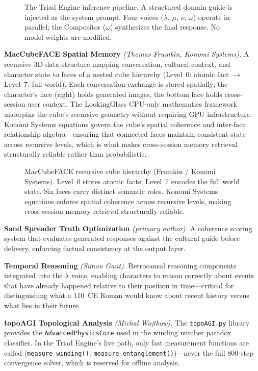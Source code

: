 \documentclass[11pt,a4paper]{article}
\begin{document}
\begin{figure}[h]
\centering

\caption{The Triad Engine inference pipeline. A structured domain guide is
injected as the system prompt. Four voices ($\lambda$, $\mu$, $\nu$,
$\omega$) operate in parallel; the Compositor ($\omega$) synthesizes the
final response. No model weights are modified.}
\label{fig:triad_integration}
\end{figure}

\medskip
\textbf{MacCubeFACE Spatial Memory} \textit{(Thomas Frumkin, Konomi
Systems).} A recursive 3D data structure mapping conversation, cultural
context, and character state to faces of a nested cube hierarchy (Level~0:
atomic fact $\to$ Level~7: full world). Each conversation exchange is stored
spatially; the character's face (right) holds generated images, the bottom
face holds cross-session user context. The LookingGlass CPU-only mathematics
framework underpins the cube's recursive geometry without requiring GPU
infrastructure. Konomi Systems equations govern the cube's spatial coherence
and inter-face relationship algebra---ensuring that connected faces maintain
consistent state across recursive levels, which is what makes cross-session
memory retrieval structurally reliable rather than probabilistic.

\begin{figure}[h]
\centering

\caption{MacCubeFACE recursive cube hierarchy (Frumkin / Konomi Systems).
Level~0 stores atomic facts; Level~7 encodes the full world state. Six faces
carry distinct semantic roles. Konomi Systems equations enforce spatial
coherence across recursive levels, making cross-session memory retrieval
structurally reliable.}
\label{fig:cube_architecture}
\end{figure}

\medskip
\textbf{Sand Spreader Truth Optimization} \textit{(primary author).}
A coherence scoring system that evaluates generated responses against the
cultural guide before delivery, enforcing factual consistency at the output
layer.

\medskip
\textbf{Temporal Reasoning} \textit{(Simon Gant).}
Retrocausal reasoning components integrated into the $\lambda$ voice, enabling
characters to reason correctly about events that have already happened relative
to their position in time---critical for distinguishing what a 110~CE Roman
would know about recent history versus what lies in their future.

\medskip
\textbf{topoAGI Topological Analysis} \textit{(Michal Wojtkow).}
The \texttt{topoAGI.py} library provides the \texttt{AdvancedPhysicsCore}
used in the winding number paradox classifier. In the Triad Engine's live
path, only fast measurement functions are called
(\texttt{measure\_winding()}, \texttt{measure\_entanglement()})---never the
full 800-step convergence solver, which is reserved for offline analysis.
\end{document}
